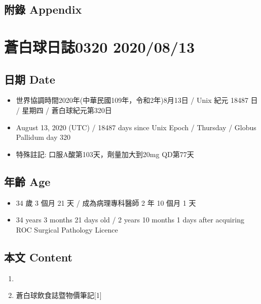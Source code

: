 \documentclass[
]{article}
\providecommand{\tightlist}{%
  \setlength{\itemsep}{0pt}\setlength{\parskip}{0pt}}
\begin{document}
\hypertarget{ux9644ux9304-appendix-11}{%
\subsection{附錄 Appendix}\label{ux9644ux9304-appendix-11}}

\hypertarget{ux84bcux767dux7403ux65e5ux8a8c0320-20200813}{%
\section{蒼白球日誌0320
2020/08/13}\label{ux84bcux767dux7403ux65e5ux8a8c0320-20200813}}

\hypertarget{ux65e5ux671f-date-12}{%
\subsection{日期 Date}\label{ux65e5ux671f-date-12}}

\begin{itemize}
\tightlist
\item
  世界協調時間2020年(中華民國109年，令和2年)8月13日 / Unix 紀元 18487 日
  / 星期四 / 蒼白球紀元第320日
\item
  August 13, 2020 (UTC) / 18487 days since Unix Epoch / Thursday /
  Globus Pallidum day 320
\item
  特殊註記: 口服A酸第103天，劑量加大到20mg QD第77天
\end{itemize}

\hypertarget{ux5e74ux9f61-age-12}{%
\subsection{年齡 Age}\label{ux5e74ux9f61-age-12}}

\begin{itemize}
\tightlist
\item
  34 歲 3 個月 21 天 / 成為病理專科醫師 2 年 10 個月 1 天
\item
  34 years 3 months 21 days old / 2 years 10 months 1 days after
  acquiring ROC Surgical Pathology Licence
\end{itemize}

\hypertarget{ux672cux6587-content-12}{%
\subsection{本文 Content}\label{ux672cux6587-content-12}}

\begin{enumerate}
\def\labelenumi{\arabic{enumi}.}
\tightlist
\item
\item
  蒼白球飲食誌暨物價筆記{[}1{]}
\end{enumerate}
\end{document}
